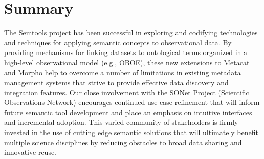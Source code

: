 \section{Summary}
\label{sec:summary}

The Semtools project has been successful in exploring and codifying technologies and techniques for applying semantic concepts to observational data. By providing mechanisms for linking datasets to ontological terms organized in a high-level observational model (e.g., OBOE), these new extensions to Metacat and Morpho help to overcome a number of limitations in
existing metadata management systems that strive to provide effective data discovery and integration features. Our close involvement with the SONet Project (Scientific Observations Network) \cite{sonet} encourages continued use-case refinement that will inform future semantic tool development and place an emphasis on intuitive interfaces and incremental adoption. This varied community of stakeholders is firmly invested in the use of cutting edge semantic solutions that will ultimately benefit multiple science disciplines by reducing obstacles to broad data sharing and innovative reuse.


